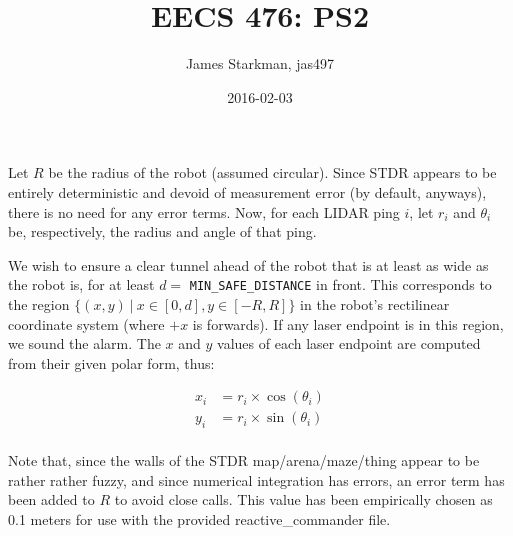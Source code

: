 \documentclass{article}
\begin{document}
\title{EECS 476: PS2}
\author{James Starkman, jas497}
\date{2016-02-03}
\maketitle

Let $R$ be the radius of the robot (assumed circular).  Since STDR
appears to be entirely deterministic and devoid of measurement error
(by default, anyways), there is no need for any error terms.  Now, for
each LIDAR ping $i$, let $r_i$ and $\theta_i$ be, respectively, the
radius and angle of that ping.

We wish to ensure a clear tunnel ahead of the robot that is at least
as wide as the robot is, for at least $d=$ \verb|MIN_SAFE_DISTANCE| in
front.  This corresponds to the region
$\{(x,y) \ |\ x\in[0,d], y\in[-R,R]\}$ in the robot's rectilinear
coordinate system (where $+x$ is forwards).  If any laser endpoint is
in this region, we sound the alarm.  The $x$ and $y$ values of each
laser endpoint are computed from their given polar form, thus:

\begin{equation*}
  \begin{array}{rl}
    x_i &= r_i\times\cos(\theta_i) \\
    y_i &= r_i\times\sin(\theta_i) \\
  \end{array}
\end{equation*}

Note that, since the walls of the STDR map/arena/maze/thing appear to
be rather rather fuzzy, and since numerical integration has errors, an
error term has been added to $R$ to avoid close calls.  This value has
been empirically chosen as 0.1 meters for use with the provided
reactive\_commander file.
\end{document}
